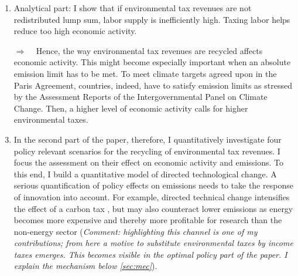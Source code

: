 \documentclass[12pt]{article}
\newcommand{\ar}{$\Rightarrow$ \ }
\begin{document}
	\begin{enumerate}
\item Analytical part: I show that if environmental tax revenues are not redistributed lump sum, labor supply is inefficiently high. Taxing labor helps reduce too high economic activity. 

\item[\ar] Hence, the way environmental tax revenues are recycled affects economic activity. This might become especially important when an absolute emission limit has to be met. To meet climate targets agreed upon in the Paris Agreement, countries, indeed, have to satisfy emission limits as stressed by the Assessment Reports of the Intergovernmental Panel on Climate Change. Then, a higher level of economic activity calls for higher environmental taxes. 

\item In the second part of the paper, therefore, I quantitatively
investigate four policy relevant scenarios for the recycling of environmental tax revenues.  I focus the assessment on their effect on economic activity and emissions. 
To this end, I build a quantitative model of directed technological change. A serious quantification of policy effects on emissions needs to take the response of innovation into account. For example, directed technical change intensifies the effect of a carbon tax \cite{Fried2018ClimateAnalysis}, but may also counteract lower emissions as energy becomes more expensive and thereby more profitable for research than the non-energy sector (\textit{Comment: highlighting this channel is one of my contributions; from here a motive to substitute environmental taxes by income taxes emerges. This becomes visible in the optimal policy part of the paper. I explain the mechanism below \ref{sec:mec}}).  


\end{enumerate}
\end{document}
